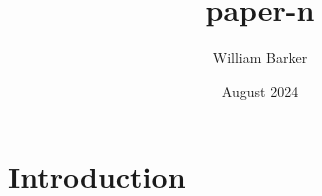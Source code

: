 \documentclass{article}
\title{paper-n}
\author{William Barker}
\date{August 2024}
\begin{document}
\maketitle

\section{Introduction}
\end{document}
